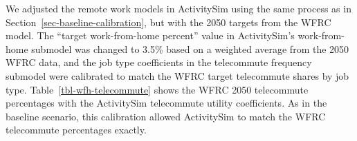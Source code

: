 \documentclass[fancy, oneside, mastersfancy, ms]{byuthesis}
\begin{document}
\begin{table}

\caption{\label{tbl-wfrc-remote-work-years}Comparison of Remote Work
Rates in the WFRC Model by Year}


\end{table}%

We adjusted the remote work models in ActivitySim using the same process
as in Section~\ref{sec-baseline-calibration}, but with the 2050 targets
from the WFRC model. The ``target work-from-home percent'' value in
ActivitySim's work-from-home submodel was changed to 3.5\% based on a
weighted average from the 2050 WFRC data, and the job type coefficients
in the telecommute frequency submodel were calibrated to match the WFRC
target telecommute shares by job type. Table~\ref{tbl-wfh-telecommute}
shows the WFRC 2050 telecommute percentages with the ActivitySim
telecommute utility coefficients. As in the baseline scenario, this
calibration allowed ActivitySim to match the WFRC telecommute
percentages exactly.
\end{document}
